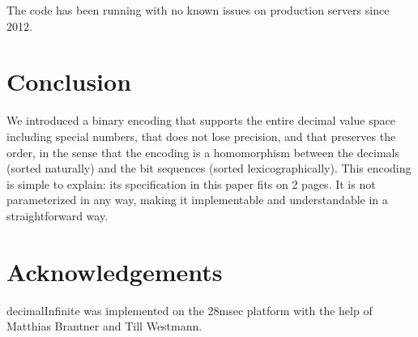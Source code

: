 \documentclass{acm_proc_article-sp}
\begin{document}
The code has been running with no known issues on production servers since 2012.

\section{Conclusion}

We introduced a binary encoding that supports the entire decimal value space including special numbers, that does not lose precision, and that preserves the order, in the sense that the encoding is a homomorphism between the decimals (sorted naturally) and the bit sequences (sorted lexicographically). This encoding is simple to explain: its specification in this paper fits on 2 pages. It is not parameterized in any way, making it implementable and understandable in a straightforward way.

\section{Acknowledgements}
decimalInfinite was implemented on the 28msec platform with the help of Matthias Brantner and Till Westmann.



\end{document}
